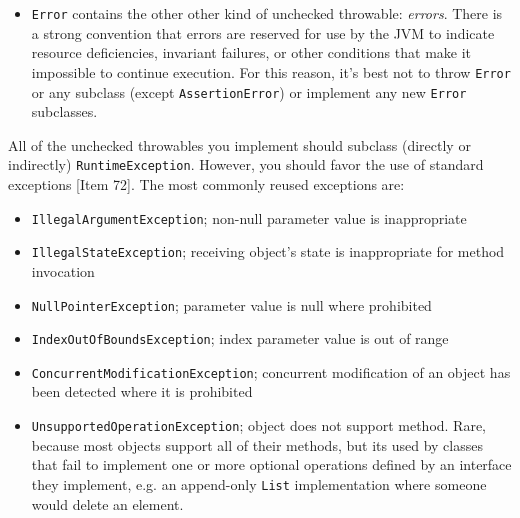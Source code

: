 \documentclass[8pt, table, xcdraw]{article}%
\begin{document}
\begin{itemize}
    All exceptions under \lstinline{Exception} are checked, except those in subclass:
    \begin{itemize}
        \item \lstinline{RuntimeException} contains \emph{unchecked exceptions}, which are not checked at compile time and are not required to -- and generally shouldn't -- be caught or declared in a \lstinline{throws} clause.\footnote{In C++, all exceptions are unchecked, where it is up to the programmers to specify or catch the exceptions.} Recovery is often impossible and continued execution would do more harm than good. \emph{Runtime exceptions} should be used to indicate programming errors, most of which violate precondition violations (e.g. \lstinline{IndexOutOfBoundsException}).
    \end{itemize}
    \item \lstinline{Error} contains the other other kind of unchecked throwable: \emph{errors}. There is a strong convention that errors are reserved for use by the JVM to indicate resource deficiencies, invariant failures, or other conditions that make it impossible to continue execution. For this reason, it’s best not to throw \lstinline{Error} or any subclass (except \lstinline{AssertionError}) or implement any new \lstinline{Error} subclasses.
\end{itemize}

All of the unchecked throwables you implement should subclass (directly or indirectly) \lstinline{RuntimeException}. However, you should favor the use of standard exceptions [Item 72]. The most commonly reused exceptions are:

\begin{itemize}
    \item \lstinline{IllegalArgumentException}; non-null parameter value is inappropriate
    \item \lstinline{IllegalStateException}; receiving object's state is inappropriate for method invocation
    \item \lstinline{NullPointerException}; parameter value is null where prohibited
    \item \lstinline{IndexOutOfBoundsException}; index parameter value is out of range
    \item \lstinline{ConcurrentModificationException}; concurrent modification of an object has been detected where it is prohibited
    \item \lstinline{UnsupportedOperationException}; object does not support method. Rare, because most objects support all of their methods, but its used by classes that fail to implement one or more optional operations defined by an interface they implement, e.g. an append-only \lstinline{List} implementation where someone would delete an element.
\end{itemize}
\end{document}
